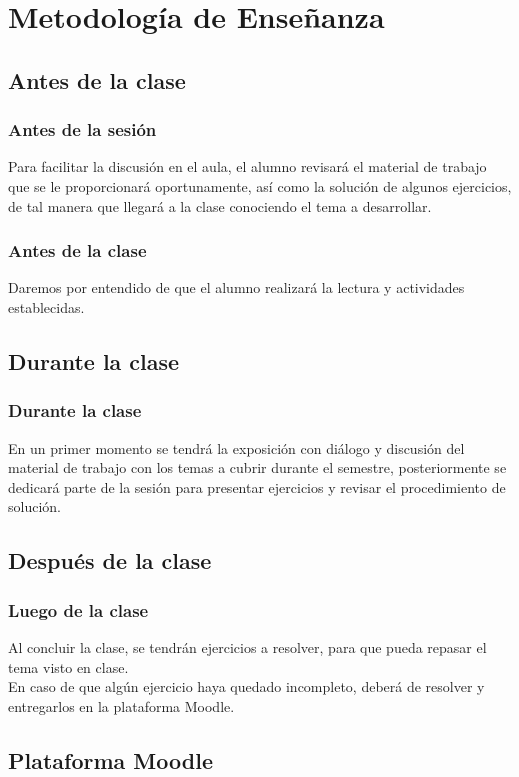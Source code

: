 \documentclass[12pt]{beamer}
\begin{document}
\section{Metodología de Enseñanza}
\subsection{Antes de la clase}

\begin{frame}
\frametitle{Antes de la sesión}
Para facilitar la discusión en el aula, el alumno revisará el material de trabajo que se le proporcionará oportunamente, así como la solución de algunos ejercicios, de tal manera que llegará a la clase conociendo el tema a desarrollar.
\end{frame}
\begin{frame}
\frametitle{Antes de la clase}
Daremos por entendido de que el alumno realizará la lectura y actividades establecidas.
\end{frame}

\subsection{Durante la clase}

\begin{frame}
\frametitle{Durante la clase}
En un primer momento se tendrá la exposición con diálogo y discusión del material de trabajo con los temas a cubrir durante el semestre, \pause posteriormente se dedicará parte de la sesión para presentar ejercicios y revisar el procedimiento de solución.
\end{frame}

\subsection{Después de la clase}

\begin{frame}
\frametitle{Luego de la clase}
Al concluir la clase, se tendrán ejercicios a resolver, para que pueda repasar el tema visto en clase.
\\
\bigskip
\pause
En caso de que algún ejercicio haya quedado incompleto, deberá de resolver y entregarlos en la plataforma Moodle.
\end{frame}

\subsection{Plataforma Moodle}
\end{document}
